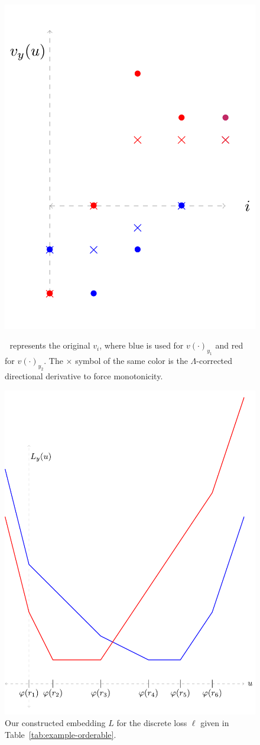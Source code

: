 \documentclass[anon]{colt2020} %
\begin{document}
\begin{figure}
	\begin{minipage}{0.45\linewidth}
	\centering
	\includegraphics[width=0.7\linewidth]{tikz/real-embed-vs}
	\caption{\textbullet $\;$ represents the original $v_i$, where blue is used for $v(\cdot)_{y_1}$ and red for $v(\cdot)_{y_2}$.  The $\times$ symbol of the same color is the $\Lambda$-corrected directional derivative to force monotonicity.}
	\label{fig:real-embed-vs}	
\end{minipage}
\hfill
\begin{minipage}{0.45\linewidth}
	\centering
	\includegraphics[width=0.7\linewidth]{tikz/real-embed-loss}
	\caption{Our constructed embedding $L$ for the discrete loss $\ell$ given in Table~\ref{tab:example-orderable}.}
	\label{fig:real-embed-loss}
\end{minipage}
\end{figure}
\end{document}
